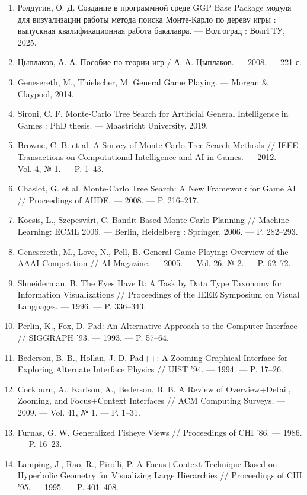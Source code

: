 \begin{enumerate}[label=\arabic*.]
  \item Ролдугин, О. Д. Создание в программной среде GGP Base Package модуля для визуализации работы метода поиска Монте-Карло по дереву игры : выпускная квалификационная работа бакалавра. — Волгоград : ВолгГТУ, 2025.
  \item Цыплаков, А. А. Пособие по теории игр / А. А. Цыплаков. — 2008. — 221 с.
  \item Genesereth, M., Thielscher, M. General Game Playing. — Morgan \& Claypool, 2014.
  \item Sironi, C. F. Monte-Carlo Tree Search for Artificial General Intelligence in Games : PhD thesis. — Maastricht University, 2019.
  \item Browne, C. B. et al. A Survey of Monte Carlo Tree Search Methods // IEEE Transactions on Computational Intelligence and AI in Games. — 2012. — Vol. 4, № 1. — P. 1–43.
  \item Chaslot, G. et al. Monte-Carlo Tree Search: A New Framework for Game AI // Proceedings of AIIDE. — 2008. — P. 216–217.
  \item Kocsis, L., Szepesvári, C. Bandit Based Monte-Carlo Planning // Machine Learning: ECML 2006. — Berlin, Heidelberg : Springer, 2006. — P. 282–293.
  \item Genesereth, M., Love, N., Pell, B. General Game Playing: Overview of the AAAI Competition // AI Magazine. — 2005. — Vol. 26, № 2. — P. 62–72.
  \item Shneiderman, B. The Eyes Have It: A Task by Data Type Taxonomy for Information Visualizations // Proceedings of the IEEE Symposium on Visual Languages. — 1996. — P. 336–343.
  \item Perlin, K., Fox, D. Pad: An Alternative Approach to the Computer Interface // SIGGRAPH '93. — 1993. — P. 57–64.
  \item Bederson, B. B., Hollan, J. D. Pad++: A Zooming Graphical Interface for Exploring Alternate Interface Physics // UIST '94. — 1994. — P. 17–26.
  \item Cockburn, A., Karlson, A., Bederson, B. B. A Review of Overview+Detail, Zooming, and Focus+Context Interfaces // ACM Computing Surveys. — 2009. — Vol. 41, № 1. — P. 1–31.
  \item Furnas, G. W. Generalized Fisheye Views // Proceedings of CHI '86. — 1986. — P. 16–23.
  \item Lamping, J., Rao, R., Pirolli, P. A Focus+Context Technique Based on Hyperbolic Geometry for Visualizing Large Hierarchies // Proceedings of CHI '95. — 1995. — P. 401–408.

\end{enumerate}

